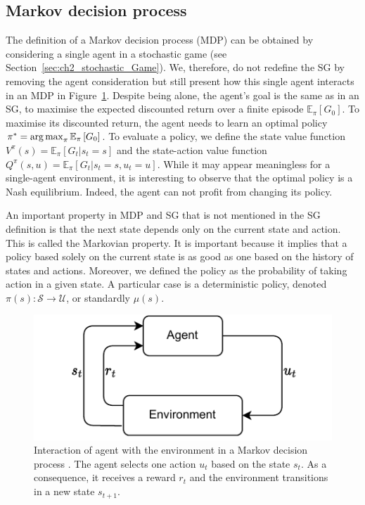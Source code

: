 \subsection{Markov decision process}
\label{sec:ch2_mdp}

The definition of a Markov decision process (MDP) can be obtained by considering a single agent in a stochastic game (see Section~\ref{sec:ch2_stochastic_Game}).
We, therefore, do not redefine the SG by removing the agent consideration but still present how this single agent interacts in an MDP in Figure~\ref{fig:ch2_mdp}.
Despite being alone, the agent's goal is the same as in an SG, to maximise the expected discounted return over a finite episode $\mathbb{E}_{\pi}\left[ G_0 \right]$.
To maximise its discounted return, the agent needs to learn an optimal policy $\pi^* = \operatorname*{arg\,max}_\pi \mathbb{E}_{\pi}\left[ G_0 \right]$.
To evaluate a policy, we define the state value function $V^\pi(s) = \mathbb{E}_{\pi}\left[G_t|s_t=s\right]$ and the state-action value function $Q^\pi(s, u) = \mathbb{E}_{\pi}\left[G_t|s_t=s, u_t=u\right]$.
While it may appear meaningless for a single-agent environment, it is interesting to observe that the optimal policy is a Nash equilibrium.
Indeed, the agent can not profit from changing its policy.

An important property in MDP and SG that is not mentioned in the SG definition is that the next state depends only on the current state and action.
This is called the Markovian property.
It is important because it implies that a policy based solely on the current state is as good as one based on the history of states and actions.
Moreover, we defined the policy as the probability of taking action in a given state.
A particular case is a deterministic policy, denoted $\pi(s):\mathcal{S}\rightarrow\mathcal{U}$, or standardly $\mu(s)$.

\begin{figure}
    \centering
    \includegraphics[width=.8\linewidth]{tex_thesis/figures/ch2/MDP.pdf}
    \caption{Interaction of agent with the environment in a Markov decision process \citep{sutton2018reinforcement}. The agent selects one action $u_t$ based on the state $s_t$. As a consequence, it receives a reward $r_t$ and the environment transitions in a new state $s_{t+1}$.}
    \label{fig:ch2_mdp}
\end{figure}

